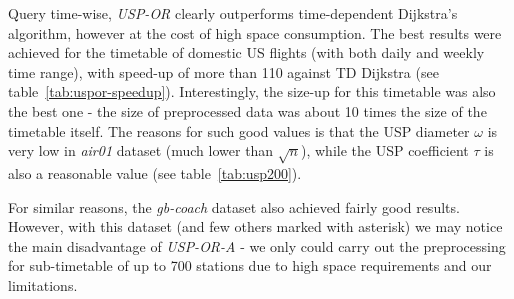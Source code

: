 		Query time-wise, \textit{USP-OR} clearly outperforms time-dependent Dijkstra's algorithm, however at the cost of high space consumption. The best results were achieved for the timetable of domestic US flights (with both daily and weekly time range), with speed-up of more than 110 against TD Dijkstra (see table~\ref{tab:uspor-speedup}). Interestingly, the size-up for this timetable was also the best one - the size of preprocessed data was about 10 times the size of the timetable itself. The reasons for such good values is that the USP diameter $\omega$ is very low in \textit{air01} dataset (much lower than $\sqrt{n}$), while the USP coefficient $\tau$ is also a reasonable value (see table~\ref{tab:usp200}).
		
		For similar reasons, the \textit{gb-coach} dataset also achieved fairly good results. However, with this dataset (and few others marked with asterisk) we may notice the main disadvantage of \textit{USP-OR-A} - we only could carry out the preprocessing for sub-timetable of up to 700 stations due to high space requirements and our limitations.
			
